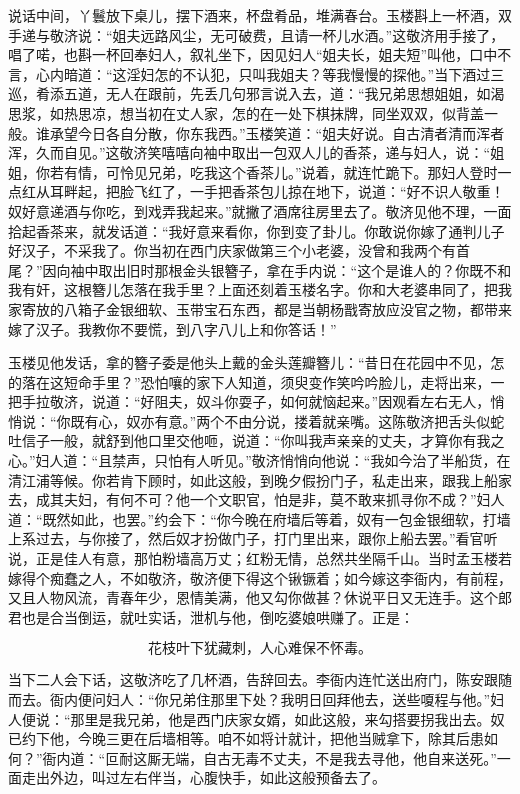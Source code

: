 说话中间，丫鬟放下桌儿，摆下酒来，杯盘肴品，堆满春台。玉楼斟上一杯酒，双手递与敬济说：“姐夫远路风尘，无可破费，且请一杯儿水酒。”这敬济用手接了，唱了喏，也斟一杯回奉妇人，叙礼坐下，因见妇人“姐夫长，姐夫短”叫他，口中不言，心内暗道：“这淫妇怎的不认犯，只叫我姐夫？等我慢慢的探他。”当下酒过三巡，肴添五道，无人在跟前，先丢几句邪言说入去，道：“我兄弟思想姐姐，如渴思浆，如热思凉，想当初在丈人家，怎的在一处下棋抹牌，同坐双双，似背盖一般。谁承望今日各自分散，你东我西。”玉楼笑道：“姐夫好说。自古清者清而浑者浑，久而自见。”这敬济笑嘻嘻向袖中取出一包双人儿的香茶，递与妇人，说：“姐姐，你若有情，可怜见兄弟，吃我这个香茶儿。”说着，就连忙跪下。那妇人登时一点红从耳畔起，把脸飞红了，一手把香茶包儿掠在地下，说道：“好不识人敬重！奴好意递酒与你吃，到戏弄我起来。”就撇了酒席往房里去了。敬济见他不理，一面拾起香茶来，就发话道：“我好意来看你，你到变了卦儿。你敢说你嫁了通判儿子好汉子，不采我了。你当初在西门庆家做第三个小老婆，没曾和我两个有首尾？”因向袖中取出旧时那根金头银簪子，拿在手内说：“这个是谁人的？你既不和我有奸，这根簪儿怎落在我手里？上面还刻着玉楼名字。你和大老婆串同了，把我家寄放的八箱子金银细软、玉带宝石东西，都是当朝杨戬寄放应没官之物，都带来嫁了汉子。我教你不要慌，到八字八\textJinXia 儿上和你答话！”

玉楼见他发话，拿的簪子委是他头上戴的金头莲瓣簪儿：“昔日在花园中不见，怎的落在这短命手里？”恐怕嚷的家下人知道，须臾变作笑吟吟脸儿，走将出来，一把手拉敬济，说道：“好阻夫，奴斗你耍子，如何就恼起来。”因观看左右无人，悄悄说：“你既有心，奴亦有意。”两个不由分说，搂着就亲嘴。这陈敬济把舌头似蛇吐信子一般，就舒到他口里交他咂，说道：“你叫我声亲亲的丈夫，才算你有我之心。”妇人道：“且禁声，只怕有人听见。”敬济悄悄向他说：“我如今治了半船货，在清江浦等候。你若肯下顾时，如此这般，到晚夕假扮门子，私走出来，跟我上船家去，成其夫妇，有何不可？他一个文职官，怕是非，莫不敢来抓寻你不成？”妇人道：“既然如此，也罢。”约会下：“你今晚在府墙后等着，奴有一包金银细软，打墙上系过去，与你接了，然后奴才扮做门子，打门里出来，跟你上船去罢。”看官听说，正是佳人有意，那怕粉墙高万丈；红粉无情，总然共坐隔千山。当时孟玉楼若嫁得个痴蠢之人，不如敬济，敬济便下得这个锹镢着；如今嫁这李衙内，有前程，又且人物风流，青春年少，恩情美满，他又勾你做甚？休说平日又无连手。这个郎君也是合当倒运，就吐实话，泄机与他，倒吃婆娘哄赚了。正是：

\[
花枝叶下犹藏刺，人心难保不怀毒。
\]

当下二人会下话，这敬济吃了几杯酒，告辞回去。李衙内连忙送出府门，陈安跟随而去。衙内便问妇人：“你兄弟住那里下处？我明日回拜他去，送些嗄程与他。”妇人便说：“那里是我兄弟，他是西门庆家女婿，如此这般，来勾搭要拐我出去。奴已约下他，今晚三更在后墙相等。咱不如将计就计，把他当贼拿下，除其后患如何？”衙内道：“叵耐这厮无端，自古无毒不丈夫，不是我去寻他，他自来送死。”一面走出外边，叫过左右伴当，心腹快手，如此这般预备去了。

